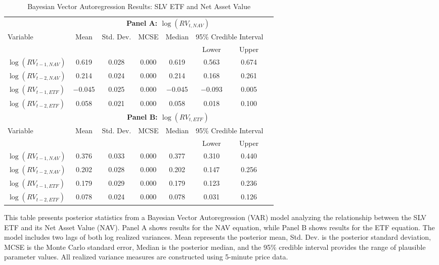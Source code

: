 \begin{landscape}
\begin{table}[htbp]
\centering
\caption{Bayesian Vector Autoregression Results: SLV ETF and Net Asset Value}
\label{tab:VAR_SLV}
\begin{threeparttable}
\footnotesize
\begin{tabular}{@{}lccccccc@{}}
\toprule
 & \multicolumn{6}{c}{\textbf{Panel A: $\log(RV_{t,NAV})$}} \\
\cmidrule(lr){2-7}
Variable & Mean & Std. Dev. & MCSE & Median & \multicolumn{2}{c}{95\% Credible Interval} \\
\cmidrule(lr){6-7}
 &  &  &  &  & Lower & Upper \\
\midrule
$\log(RV_{t-1,NAV})$ & 0.619 & 0.028 & 0.000 & 0.619 & 0.563 & 0.674 \\
$\log(RV_{t-2,NAV})$ & 0.214 & 0.024 & 0.000 & 0.214 & 0.168 & 0.261 \\
$\log(RV_{t-1,ETF})$ & $-$0.045 & 0.025 & 0.000 & $-$0.045 & $-$0.093 & 0.005 \\
$\log(RV_{t-2,ETF})$ & 0.058 & 0.021 & 0.000 & 0.058 & 0.018 & 0.100 \\
\addlinespace[0.3cm]

 & \multicolumn{6}{c}{\textbf{Panel B: $\log(RV_{t,ETF})$}} \\
\cmidrule(lr){2-7}
Variable & Mean & Std. Dev. & MCSE & Median & \multicolumn{2}{c}{95\% Credible Interval} \\
\cmidrule(lr){6-7}
 &  &  &  &  & Lower & Upper \\
\midrule
$\log(RV_{t-1,NAV})$ & 0.376 & 0.033 & 0.000 & 0.377 & 0.310 & 0.440 \\
$\log(RV_{t-2,NAV})$ & 0.202 & 0.028 & 0.000 & 0.202 & 0.147 & 0.256 \\
$\log(RV_{t-1,ETF})$ & 0.179 & 0.029 & 0.000 & 0.179 & 0.123 & 0.236 \\
$\log(RV_{t-2,ETF})$ & 0.078 & 0.024 & 0.000 & 0.078 & 0.031 & 0.126 \\
\bottomrule
\end{tabular}
\begin{tablenotes}
\small
\item This table presents posterior statistics from a Bayesian Vector Autoregression (VAR) model analyzing the relationship between the SLV ETF and its Net Asset Value (NAV). Panel A shows results for the NAV equation, while Panel B shows results for the ETF equation. The model includes two lags of both log realized variances. Mean represents the posterior mean, Std. Dev. is the posterior standard deviation, MCSE is the Monte Carlo standard error, Median is the posterior median, and the 95\% credible interval provides the range of plausible parameter values. All realized variance measures are constructed using 5-minute price data.
\end{tablenotes}
\end{threeparttable}
\end{table}
\end{landscape}

